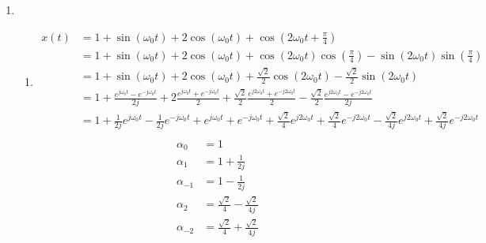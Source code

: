 \documentclass[10pt,a4paper, margin=1in]{article}
\begin{document}
\begin{enumerate}
\item %
    \begin{enumerate}   
    \item %
    \begin{align*}
        x(t) & = 1 + \sin(\omega_0t) + 2\cos(\omega_0t) + \cos(2\omega_0t + \frac{\pi}{4}) \\
        & = 1 + \sin(\omega_0t) + 2\cos(\omega_0t) + \cos(2\omega_0t)\cos(\frac{\pi}{4}) - \sin(2\omega_0t)\sin(\frac{\pi}{4}) \\
        & = 1 + \sin(\omega_0t) + 2\cos(\omega_0t) + \frac{\sqrt{2}}{2}\cos(2\omega_0t) - \frac{\sqrt{2}}{2}\sin(2\omega_0t) \\
        & = 1 + \frac{e^{j\omega_0t} - e^{-j\omega_0t}}{2j} + 2\frac{e^{j\omega_0t} + e^{-j\omega_0t}}{2} + \frac{\sqrt{2}}{2}\frac{e^{j2\omega_0t} + e^{-j2\omega_0t}}{2} - \frac{\sqrt{2}}{2}\frac{e^{j2\omega_0t} - e^{-j2\omega_0t}}{2j} \\
        & = 1 + \frac{1}{2j}e^{j\omega_0t} - \frac{1}{2j}e^{-j\omega_0t} + e^{j\omega_0t} + e^{-j\omega_0t} + \frac{\sqrt{2}}{4}e^{j2\omega_0t} + \frac{\sqrt{2}}{4}e^{-j2\omega_0t} - \frac{\sqrt{2}}{4j}e^{j2\omega_0t} + \frac{\sqrt{2}}{4j}e^{-j2\omega_0t} \\
    \end{align*}
    \begin{align*}
        \alpha_0 & = 1 \\
        \alpha_1 & = 1 + \frac{1}{2j}\\
        \alpha_{-1} & = 1 - \frac{1}{2j}\\
        \alpha_2 & = \frac{\sqrt{2}}{4} - \frac{\sqrt{2}}{4j}\\
        \alpha_{-2} & = \frac{\sqrt{2}}{4} + \frac{\sqrt{2}}{4j}\\
    \end{align*}

     \\


\end{enumerate}
\end{enumerate}
\end{document}
